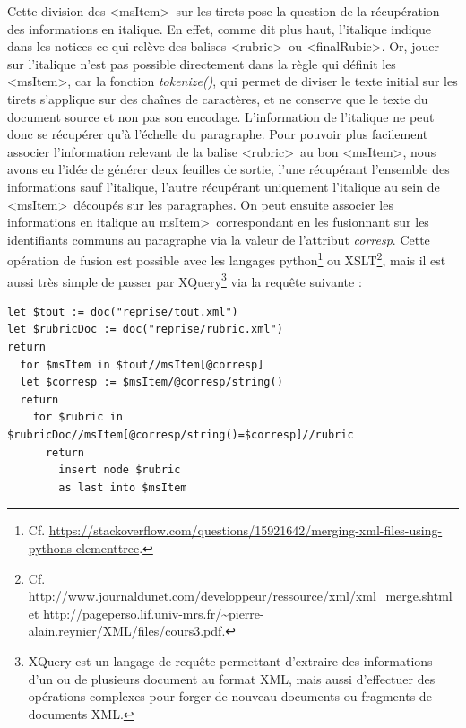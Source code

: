 \documentclass[a4paper,12pt,twoside]{book}
\begin{document}
Cette division des \textless msItem\textgreater~sur les tirets pose la question de la récupération des informations en italique. En effet, comme dit plus haut, l'italique indique dans les notices ce qui relève des balises \textless rubric\textgreater~ou \textless finalRubic\textgreater . Or, jouer sur l'italique n'est pas possible directement dans la règle qui définit les \textless msItem\textgreater, car la fonction \textit{tokenize()}, qui permet de diviser le texte initial sur les tirets s'applique sur des chaînes de caractères, et ne conserve que le texte du document source et non pas son encodage. L'information de l'italique ne peut donc se récupérer qu'à l'échelle du paragraphe. Pour pouvoir plus facilement associer l'information relevant de la balise \textless rubric\textgreater~au bon \textless msItem\textgreater, nous avons eu l'idée de générer deux feuilles de sortie, l'une récupérant l'ensemble des informations sauf l'italique, l'autre récupérant uniquement l'italique au sein de \textless msItem\textgreater~découpés sur les paragraphes. On peut ensuite associer les informations en italique au \textles msItem\textgreater~correspondant en les fusionnant sur les identifiants communs au paragraphe via la valeur de l'attribut \textit{corresp}. Cette opération de fusion est possible avec les langages python\footnote{Cf. \url{https://stackoverflow.com/questions/15921642/merging-xml-files-using-pythons-elementtree}.} ou XSLT\footnote{Cf. \url{http://www.journaldunet.com/developpeur/ressource/xml/xml_merge.shtml} et \url{http://pageperso.lif.univ-mrs.fr/~pierre-alain.reynier/XML/files/cours3.pdf}.}, mais il est aussi très simple de passer par XQuery\footnote{XQuery est un langage de requête permettant d'extraire des informations d'un ou de plusieurs document au format XML, mais aussi d'effectuer des opérations complexes pour forger de nouveau documents ou fragments de documents XML.} via la requête suivante : 
\begin{verbatim}
let $tout := doc("reprise/tout.xml")
let $rubricDoc := doc("reprise/rubric.xml")
return 
  for $msItem in $tout//msItem[@corresp]
  let $corresp := $msItem/@corresp/string()
  return 
    for $rubric in $rubricDoc//msItem[@corresp/string()=$corresp]//rubric
      return 
        insert node $rubric
        as last into $msItem
\end{verbatim}
\end{document}
